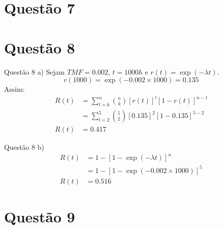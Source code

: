 \documentclass[fleqn]{beamer}\usepackage[]{graphicx}\usepackage[]{color}
\begin{document}
	\section{Questão 7}
	\section{Questão 8}
		\begin{frame}{Questão 8}
			a)  Sejam $TMF = 0.002$, $t = 1000h$ e $r(t) = \exp(-\lambda t)$.
			$$r(1000) = \exp(-0.002\times1000) = 0.135$$
			Assim:
			\begin{align*}
				R(t) &= \sum_{l = k}^{n} \binom{n}{k} [r(t)] ^{l} [1-r(t)] ^{n-l}\\
					&= \sum_{l = 2}^{5} \binom{5}{2} [0.135] ^{2} [1-0.135] ^{5-2}\\
				R(t) &=  0.417
			\end{align*}
		\end{frame}
		\begin{frame}{Questão 8}
			b)\begin{align*}
					R(t) &= 1 - [1 - \exp(-\lambda t)]^{n}\\
						&= 1 - [1 - \exp(-0.002\times1000)]^{5}\\
					R(t) &= 0.516
			\end{align*}
		\end{frame}
	\section{Questão 9}
\end{document}
